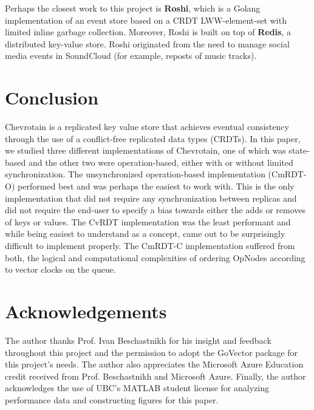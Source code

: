 \documentclass[sigconf,nonacm,10pt]{acmart}
\begin{document}
Perhaps the closest work to this project is \textbf{Roshi}, which is a Golang implementation of an event store based on a CRDT LWW-element-set with limited inline garbage collection. Moreover, Roshi is built on top of \textbf{Redis}, a distributed key-value store. Roshi originated from the need to manage social media events in SoundCloud (for example, reposts of music tracks).

\section{Conclusion}
Chevrotain is a replicated key value store that achieves eventual consistency through the use of a conflict-free replicated data types (CRDTs). In this paper, we studied three different implementations of Chevrotain, one of which was state-based and the other two were operation-based, either with or without limited synchronization. The unsynchronized operation-based implementation (CmRDT-O) performed best and was perhaps the easiest to work with. This is the only implementation that did not require any synchronization between replicas and did not require the end-user to specify a bias towards either the adds or removes of keys or values. The CvRDT implementation was the least performant and while being easiest to understand as a concept, came out to be surprisingly difficult to implement properly. The CmRDT-C implementation suffered from both, the logical and computational complexities of ordering OpNodes according to vector clocks on the queue.

\section*{Acknowledgements}
The author thanks Prof. Ivan Beschastnikh for his insight and feedback throughout this project and the permission to adopt the GoVector package for this project's needs. The author also appreciates the Microsoft Azure Education credit received from Prof. Beschastnikh and Microsoft Azure. Finally, the author acknowledges the use of UBC's MATLAB student license for analyzing performance data and constructing figures for this paper.



\end{document}

